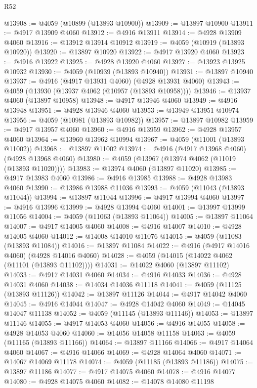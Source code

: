 \begin{lexlean}{R52}
\begin{coremodule}
@13908 := @4059 (@10899 (@13893 @10900))
@13909 := @13897 @10900
@13911 := @4917 @13909 @4060
@13912 := @4916 @13911
@13914 := @4928 @13909 @4060
@13916 := @13912 @13914 @10912
@13919 := @4059 (@10919 (@13893 @10920))
@13920 := @13897 @10920
@13922 := @4917 @13920 @4060
@13923 := @4916 @13922
@13925 := @4928 @13920 @4060
@13927 := @13923 @13925 @10932
@13930 := @4059 (@10939 (@13893 @10940))
@13931 := @13897 @10940
@13937 := @4916 (@4917 @13931 @4060) (@4928 @13931 @4060)
@13943 := @4059 (@13930 (@13937 @4062 (@10957 (@13893 @10958))))
@13946 := @13937 @4060 (@13897 @10958)
@13948 := @4917 @13946 @4060
@13949 := @4916 @13948
@13951 := @4928 @13946 @4060
@13953 := @13949 @13951 @10974
@13956 := @4059 (@10981 (@13893 @10982))
@13957 := @13897 @10982
@13959 := @4917 @13957 @4060
@13960 := @4916 @13959
@13962 := @4928 @13957 @4060
@13964 := @13960 @13962 @10994
@13967 := @4059 (@11001 (@13893 @11002))
@13968 := @13897 @11002
@13974 := @4916 (@4917 @13968 @4060) (@4928 @13968 @4060)
@13980 := @4059 (@13967 (@13974 @4062 (@11019 (@13893 @11020))))
@13983 := @13974 @4060 (@13897 @11020)
@13985 := @4917 @13983 @4060
@13986 := @4916 @13985
@13988 := @4928 @13983 @4060
@13990 := @13986 @13988 @11036
@13993 := @4059 (@11043 (@13893 @11044))
@13994 := @13897 @11044
@13996 := @4917 @13994 @4060
@13997 := @4916 @13996
@13999 := @4928 @13994 @4060
@14001 := @13997 @13999 @11056
@14004 := @4059 (@11063 (@13893 @11064))
@14005 := @13897 @11064
@14007 := @4917 @14005 @4060
@14008 := @4916 @14007
@14010 := @4928 @14005 @4060
@14012 := @14008 @14010 @11076
@14015 := @4059 (@11083 (@13893 @11084))
@14016 := @13897 @11084
@14022 := @4916 (@4917 @14016 @4060) (@4928 @14016 @4060)
@14028 := @4059 (@14015 (@14022 @4062 (@11101 (@13893 @11102))))
@14031 := @14022 @4060 (@13897 @11102)
@14033 := @4917 @14031 @4060
@14034 := @4916 @14033
@14036 := @4928 @14031 @4060
@14038 := @14034 @14036 @11118
@14041 := @4059 (@11125 (@13893 @11126))
@14042 := @13897 @11126
@14044 := @4917 @14042 @4060
@14045 := @4916 @14044
@14047 := @4928 @14042 @4060
@14049 := @14045 @14047 @11138
@14052 := @4059 (@11145 (@13893 @11146))
@14053 := @13897 @11146
@14055 := @4917 @14053 @4060
@14056 := @4916 @14055
@14058 := @4928 @14053 @4060
@14060 := @14056 @14058 @11158
@14063 := @4059 (@11165 (@13893 @11166))
@14064 := @13897 @11166
@14066 := @4917 @14064 @4060
@14067 := @4916 @14066
@14069 := @4928 @14064 @4060
@14071 := @14067 @14069 @11178
@14074 := @4059 (@11185 (@13893 @11186))
@14075 := @13897 @11186
@14077 := @4917 @14075 @4060
@14078 := @4916 @14077
@14080 := @4928 @14075 @4060
@14082 := @14078 @14080 @11198

\end{coremodule}
\end{lexlean}
